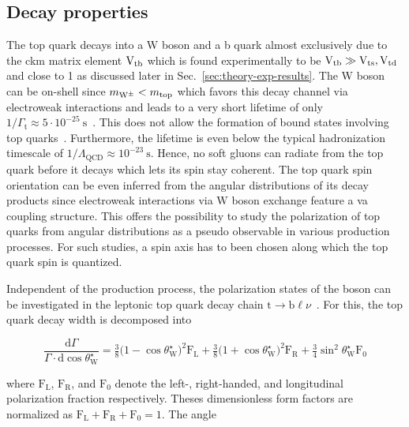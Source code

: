 \subsection{Decay properties}

The top quark decays into a W boson and a b quark almost exclusively due to the \gls{ckm} matrix element ${\mathrm{V}_\mathrm{tb}}$ which is found experimentally to be ${\mathrm{V}_\mathrm{tb}}\gg{\mathrm{V}_\mathrm{ts}},{\mathrm{V}_\mathrm{td}}$ and close to 1 as discussed later in Sec.~\ref{sec:theory-exp-results}. The W boson can be on-shell since $m_{\mathrm{W}^{\pm}}<m_\mathrm{top}$ which favors this decay channel via electroweak interactions and leads to a very short lifetime of only $1/\Gamma_\mathrm{t}\approx 5\cdot10^{-25}~\mathrm{s}$~\cite{Olive:2016xmw}. This does not allow the formation of bound states involving top quarks~\cite{BIGI1986157}. Furthermore, the lifetime is even below the typical hadronization timescale of $1/\Lambda_\mathrm{QCD}\approx 10^{-23}~\mathrm{s}$. Hence, no soft gluons can radiate from the top quark before it decays which lets its spin stay coherent. The top quark spin orientation can be even inferred from the angular distributions of its decay products since electroweak interactions via $\mathrm{W}$ boson exchange feature a \gls{va} coupling structure. This offers the possibility to study the polarization of top quarks from angular distributions as a pseudo observable in various production processes. For such studies, a spin axis has to been chosen along which the top quark spin is quantized.

Independent of the production process, the polarization states of the \wboson boson can be investigated in the leptonic top quark decay chain $\mathrm{t}\to\mathrm{b}\ell\nu$~\cite{AguilarSaavedra:2010nx}. For this, the top quark decay width is decomposed into

\begin{equation}
\frac{\mathrm{d}\Gamma}{\Gamma\cdot\mathrm{d}\cos\theta^\star_\mathrm{W}}=\tfrac{3}{8}\big(1-\cos\theta^\star_\mathrm{W}\big)^{2}\mathrm{F}_\mathrm{L}+\tfrac{3}{8}\big(1+\cos\theta^\star_\mathrm{W}\big)^{2}\mathrm{F}_\mathrm{R}+\tfrac{3}{4}\sin^{2}\theta^\star_\mathrm{W}\mathrm{F}_{0}
\end{equation}

where $\mathrm{F}_\mathrm{L}$, $\mathrm{F}_\mathrm{R}$, and $\mathrm{F}_{0}$ denote the left-, right-handed, and longitudinal polarization fraction respectively. Theses dimensionless form factors are normalized as $\mathrm{F}_\mathrm{L}+\mathrm{F}_\mathrm{R}+\mathrm{F}_{0}=1$. The angle 

